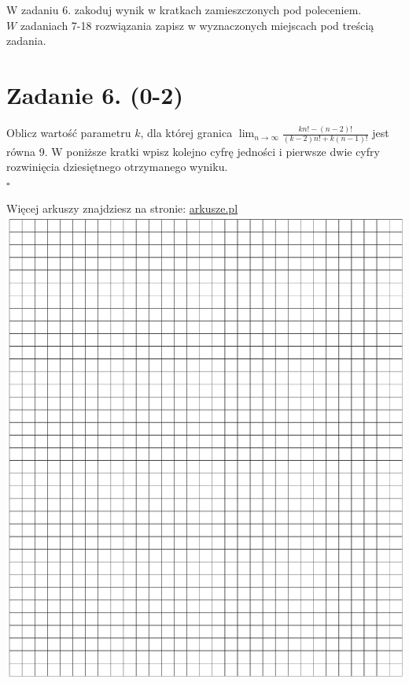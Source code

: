 \documentclass[10pt]{article}
\begin{document}
W zadaniu 6. zakoduj wynik w kratkach zamieszczonych pod poleceniem.\\
\(W\) zadaniach 7-18 rozwiązania zapisz w wyznaczonych miejscach pod treścią zadania.

\section*{Zadanie 6. (0-2)}
Oblicz wartość parametru \(k\), dla której granica \(\lim _{n \rightarrow \infty} \frac{k n!-(n-2)!}{(k-2) n!+k(n-1)!}\) jest równa 9. W poniższe kratki wpisz kolejno cyfrę jedności i pierwsze dwie cyfry rozwinięcia dziesiętnego otrzymanego wyniku.\\
\(\square\)

Więcej arkuszy znajdziesz na stronie: \href{http://arkusze.pl}{arkusze.pl}\\
\includegraphics[max width=\textwidth, center]{2024_11_21_f29375993e8c629c464fg-04}
\end{document}
